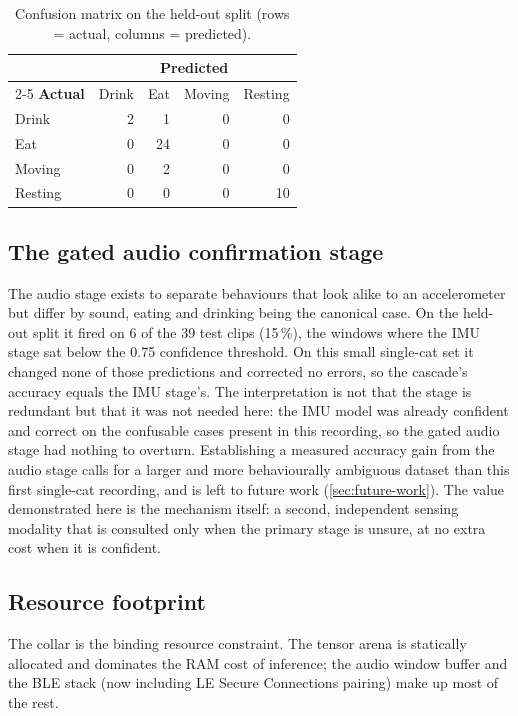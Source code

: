 \begin{table}[ht]
  \centering
  \caption{Confusion matrix on the held-out split (rows = actual, columns = predicted).}
  \label{tab:confusion}
  \begin{tabular}{@{}l rrrr@{}}
    \toprule
    & \multicolumn{4}{c}{\textbf{Predicted}} \\
    \cmidrule(lr){2-5}
    \textbf{Actual} & Drink & Eat & Moving & Resting \\
    \midrule
    Drink   & 2 & 1  & 0 & 0 \\
    Eat     & 0 & 24 & 0 & 0 \\
    Moving  & 0 & 2  & 0 & 0 \\
    Resting & 0 & 0  & 0 & 10 \\
    \bottomrule
  \end{tabular}
\end{table}

\subsection{The gated audio confirmation stage}

The audio stage exists to separate behaviours that look alike to an accelerometer but differ by sound,
eating and drinking being the canonical case. On the held-out split it fired on 6 of the 39 test clips
(15\,\%), the windows where the IMU stage sat below the 0.75 confidence threshold. On this small
single-cat set it changed none of those predictions and corrected no errors, so the cascade's accuracy
equals the IMU stage's. The interpretation is not that the stage is redundant but that it was not needed
here: the IMU model was already confident and correct on the confusable cases present in this recording,
so the gated audio stage had nothing to overturn. Establishing a measured accuracy gain from the audio
stage calls for a larger and more behaviourally ambiguous dataset than this first single-cat recording,
and is left to future work (\cref{sec:future-work}). The value demonstrated here is the mechanism itself:
a second, independent sensing modality that is consulted only when the primary stage is unsure, at no
extra cost when it is confident.

\subsection{Resource footprint}

The collar is the binding resource constraint. The tensor arena is statically allocated and dominates the
RAM cost of inference; the audio window buffer and the BLE stack (now including LE Secure Connections
pairing) make up most of the rest.

